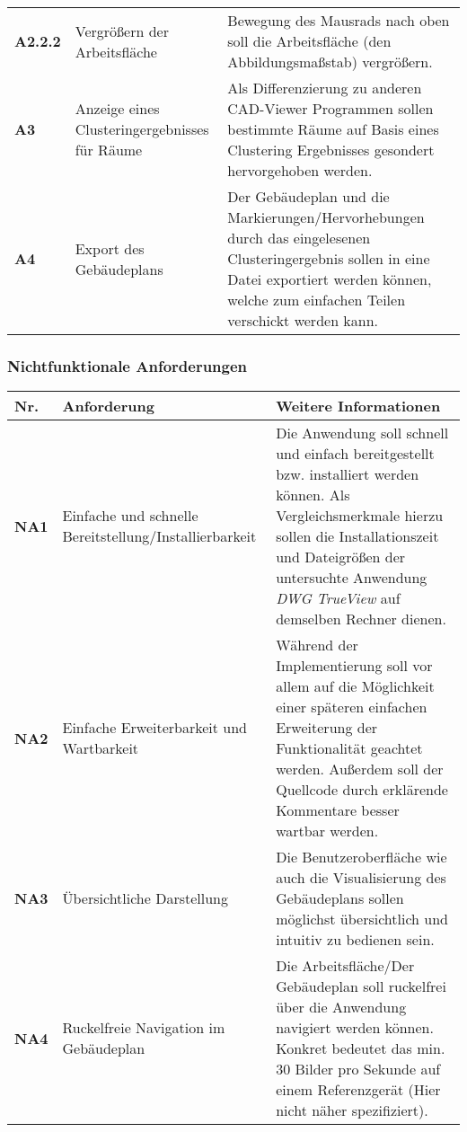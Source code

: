 \begin{center}
\begin{supertabular}{ p{1cm}|p{3cm}|p{4cm} }
        \textbf{A2.2.2} & Vergrößern der Arbeitsfläche                  & Bewegung des Mausrads nach oben soll die Arbeitsfläche (den Abbildungsmaßstab) vergrößern.                                                                                                       \\
        \textbf{A3}     & Anzeige eines Clusteringergebnisses für Räume & Als Differenzierung zu anderen CAD-Viewer Programmen sollen bestimmte Räume auf Basis eines Clustering Ergebnisses gesondert hervorgehoben werden.                                               \\
        \textbf{A4}     & Export des Gebäudeplans                       & Der Gebäudeplan und die Markierungen/Hervorhebungen durch das eingelesenen Clusteringergebnis sollen in eine Datei exportiert werden können, welche zum einfachen Teilen verschickt werden kann. \\
    \end{supertabular}
\end{center}

\vspace{10pt}

\subsubsection{Nichtfunktionale Anforderungen}
\label{subsubsec:non-functional-requirements}

\begin{center}
    \begin{supertabular}{ p{1cm}|p{3cm}|p{4cm} }
        Nr. & Anforderung & Weitere Informationen \\
        \hline
        \textbf{NA1} & Einfache und schnelle Bereitstellung/Installierbarkeit & Die Anwendung soll schnell und einfach bereitgestellt bzw. installiert werden können. Als Vergleichsmerkmale hierzu sollen die Installationszeit und Dateigrößen der untersuchte Anwendung \textit{DWG TrueView} auf demselben Rechner dienen. \\
        \textbf{NA2} & Einfache Erweiterbarkeit und Wartbarkeit & Während der Implementierung soll vor allem auf die Möglichkeit einer späteren einfachen Erweiterung der Funktionalität geachtet werden. Außerdem soll der Quellcode durch erklärende Kommentare besser wartbar werden. \\
        \textbf{NA3} & Übersichtliche Darstellung & Die Benutzeroberfläche wie auch die Visualisierung des Gebäudeplans sollen möglichst übersichtlich und intuitiv zu bedienen sein. \\
        \textbf{NA4} & Ruckelfreie Navigation im Gebäudeplan & Die Arbeitsfläche/Der Gebäudeplan soll ruckelfrei über die Anwendung navigiert werden können. Konkret bedeutet das min. 30 Bilder pro Sekunde auf einem Referenzgerät (Hier nicht näher spezifiziert). \\
    \end{supertabular}
\end{center}
